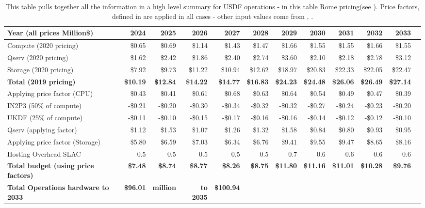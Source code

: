 \tiny \begin{longtable} { |p{}  |r  |r  |r  |r  |r  |r  |r  |r  |r  |r  |r |} 
\caption{This table pulls together all the information in a high level summary for USDF operations - in this table Rome pricing(see ). Price factors, defined in  are applied in all cases - other input values come from , .
 \label{tab:opsSumUSDF}}\\ 
\hline 
\textbf{Year  (all prices Million\$)}&\textbf{2024}&\textbf{2025}&\textbf{2026}&\textbf{2027}&\textbf{2028}&\textbf{2029}&\textbf{2030}&\textbf{2031}&\textbf{2032}&\textbf{2033} \\ \hline
{Compute (2020 pricing)}&{\$0.65}&{\$0.69}&{\$1.14}&{\$1.43}&{\$1.47}&{\$1.66}&{\$1.55}&{\$1.55}&{\$1.66}&{\$1.55} \\ \hline
{Qserv (2020 pricing)}&{\$1.62}&{\$2.42}&{\$1.86}&{\$2.40}&{\$2.74}&{\$3.60}&{\$2.10}&{\$2.18}&{\$2.78}&{\$3.12} \\ \hline
{Storage (2020 pricing)}&{\$7.92}&{\$9.73}&{\$11.22}&{\$10.94}&{\$12.62}&{\$18.97}&{\$20.83}&{\$22.33}&{\$22.05}&{\$22.47} \\ \hline
\textbf{Total (2019 pricing)}&\textbf{\$10.19}&\textbf{\$12.84}&\textbf{\$14.22}&\textbf{\$14.77}&\textbf{\$16.83}&\textbf{\$24.23}&\textbf{\$24.48}&\textbf{\$26.06}&\textbf{\$26.49}&\textbf{\$27.14} \\ \hline
{Applying price factor (CPU)}&{\$0.43}&{\$0.41}&{\$0.61}&{\$0.68}&{\$0.63}&{\$0.64}&{\$0.54}&{\$0.49}&{\$0.47}&{\$0.39} \\ \hline
{IN2P3 (50\% of compute)}&{-\$0.21}&{-\$0.20}&{-\$0.30}&{-\$0.34}&{-\$0.32}&{-\$0.32}&{-\$0.27}&{-\$0.24}&{-\$0.23}&{-\$0.20} \\ \hline
{UKDF (25\% of compute)}&{-\$0.11}&{-\$0.10}&{-\$0.15}&{-\$0.17}&{-\$0.16}&{-\$0.16}&{-\$0.14}&{-\$0.12}&{-\$0.12}&{-\$0.10} \\ \hline
{Qserv (applying factor)}&{\$1.12}&{\$1.53}&{\$1.07}&{\$1.26}&{\$1.32}&{\$1.58}&{\$0.84}&{\$0.80}&{\$0.93}&{\$0.95} \\ \hline
{Applying price factor (Storage)}&{\$5.80}&{\$6.59}&{\$7.03}&{\$6.34}&{\$6.76}&{\$9.41}&{\$9.55}&{\$9.47}&{\$8.65}&{\$8.16} \\ \hline
{Hosting Overhead SLAC
}&{0.5}&{0.5}&{0.5}&{0.5}&{0.5}&{0.7}&{0.6}&{0.6}&{0.6}&{0.6} \\ \hline
\textbf{Total budget (using price factors)}&\textbf{\$7.48}&\textbf{\$8.74}&\textbf{\$8.77}&\textbf{\$8.26}&\textbf{\$8.75}&\textbf{\$11.80}&\textbf{\$11.16}&\textbf{\$11.01}&\textbf{\$10.28}&\textbf{\$9.76} \\ \hline
\textbf{Total Operations hardware to 2033}&\textbf{\$96.01}&\textbf{million}&\textbf{to 2035}&\textbf{\$100.94}&&&&&& \\ \hline
\end{longtable} \normalsize
